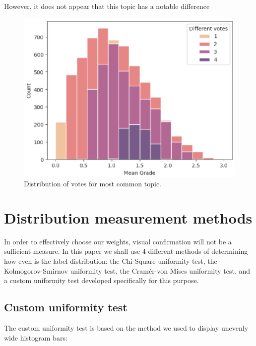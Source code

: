 \documentclass[10pt, a4paper]{article}
\begin{document}
However, it does not appear that this topic has a notable difference 
\begin{figure}
\begin{center}
\includegraphics[width=\columnwidth]{t vote distribution.pdf}
\caption{Distribution of votes for most common topic.}
\label{fig:figure1}
\end{center}
\end{figure}



\section{Distribution measurement methods}
In order to effectively choose our weights, visual confirmation will not be a sufficient measure.
In this paper we shall use 4 different methods of determining how even is the label distribution: the Chi-Square uniformity test, the Kolmogorov-Smirnov uniformity test, the Cramér-von Mises uniformity test, and a custom uniformity test developed specifically for this purpose.
\subsection{Custom uniformity test}
The custom uniformity test is based on the method we used to display unevenly wide histogram bars:
\end{document}
